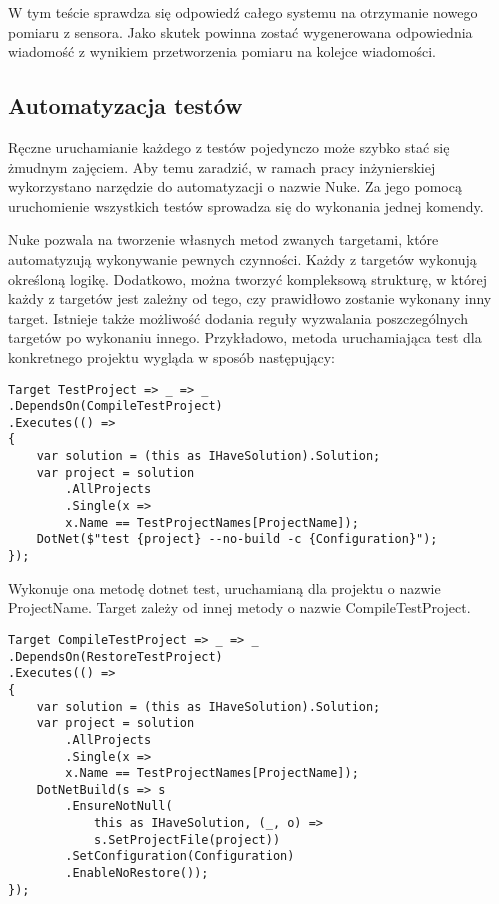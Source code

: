 W tym teście sprawdza się odpowiedź całego systemu na otrzymanie nowego pomiaru 
z sensora. Jako skutek powinna zostać wygenerowana odpowiednia wiadomość z wynikiem 
przetworzenia pomiaru na kolejce wiadomości.

\subsection{Automatyzacja testów}

Ręczne uruchamianie każdego z testów pojedynczo może szybko stać się żmudnym zajęciem. 
Aby temu zaradzić, w ramach pracy inżynierskiej wykorzystano narzędzie do automatyzacji 
o nazwie Nuke. Za jego pomocą uruchomienie wszystkich testów sprowadza się do wykonania 
jednej komendy. 

Nuke pozwala na tworzenie własnych metod zwanych targetami, które automatyzują 
wykonywanie pewnych czynności. Każdy z targetów wykonują określoną logikę. 
Dodatkowo, można tworzyć kompleksową strukturę, w której każdy z targetów jest zależny 
od tego, czy prawidłowo zostanie wykonany inny target. Istnieje także możliwość 
dodania reguły wyzwalania poszczególnych targetów po wykonaniu innego. 
Przykładowo, metoda uruchamiająca test dla konkretnego projektu wygląda w sposób 
następujący:

\begin{lstlisting}
Target TestProject => _ => _
.DependsOn(CompileTestProject)
.Executes(() =>
{
    var solution = (this as IHaveSolution).Solution;
    var project = solution
        .AllProjects
        .Single(x => 
        x.Name == TestProjectNames[ProjectName]);
    DotNet($"test {project} --no-build -c {Configuration}");
});
\end{lstlisting}

Wykonuje ona metodę dotnet test, uruchamianą dla projektu o nazwie ProjectName. 
Target zależy od innej metody o nazwie CompileTestProject.

\begin{lstlisting}
Target CompileTestProject => _ => _
.DependsOn(RestoreTestProject)
.Executes(() =>
{
    var solution = (this as IHaveSolution).Solution;
    var project = solution
        .AllProjects
        .Single(x => 
        x.Name == TestProjectNames[ProjectName]);
    DotNetBuild(s => s
        .EnsureNotNull(
            this as IHaveSolution, (_, o) => 
            s.SetProjectFile(project))
        .SetConfiguration(Configuration)
        .EnableNoRestore());
});
\end{lstlisting}

